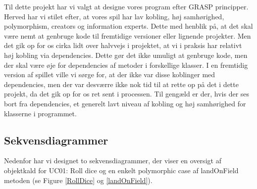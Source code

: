 \begin{flushleft}
\doublespacing
Til dette projekt har vi valgt at designe vores program efter GRASP principper. Herved har vi stilet efter, at vores spil har lav kobling, høj samhørighed, polymorphism, creators og information experts. Dette med henblik på, at det skal være nemt at genbruge kode til fremtidige versioner eller lignende projekter. Men det gik op for os cirka lidt over halvvejs i projektet, at vi i praksis har relativt høj kobling via dependencies. Dette gør det ikke umuligt at genbruge kode, men der skal være øje for dependencies af metoder i forskellige klasser. I en fremtidig version af spillet ville vi sørge for, at der ikke var disse koblinger med dependencies, men der var desværre ikke nok tid til at rette op på det i dette projekt, da det gik op for os ret sent i processen. Til gengæld er der, hvis der ses bort fra dependencies, et generelt lavt niveau af kobling og høj samhørighed for klasserne i programmet.\\

\subsection{Sekvensdiagrammer}
Nedenfor har vi designet to sekvensdiagrammer, der viser en oversigt af objektkald for UC01: Roll dice og en enkelt polymorphic case af landOnField metoden (se Figure \ref{RollDice} og \ref{landOnField}).


\end{flushleft}
